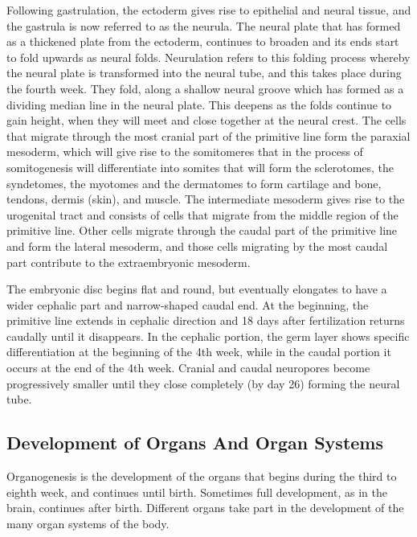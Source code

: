 Following gastrulation, the ectoderm gives rise to epithelial and neural tissue, and the gastrula is now referred to as the neurula. The neural plate that has formed as a thickened plate from the ectoderm, continues to broaden and its ends start to fold upwards as neural folds. Neurulation refers to this folding process whereby the neural plate is transformed into the neural tube, and this takes place during the fourth week. They fold, along a shallow neural groove which has formed as a dividing median line in the neural plate. This deepens as the folds continue to gain height, when they will meet and close together at the neural crest. The cells that migrate through the most cranial part of the primitive line form the paraxial mesoderm, which will give rise to the somitomeres that in the process of somitogenesis will differentiate into somites that will form the sclerotomes, the syndetomes, the myotomes and the dermatomes to form cartilage and bone, tendons, dermis (skin), and muscle. The intermediate mesoderm gives rise to the urogenital tract and consists of cells that migrate from the middle region of the primitive line. Other cells migrate through the caudal part of the primitive line and form the lateral mesoderm, and those cells migrating by the most caudal part contribute to the extraembryonic mesoderm.

The embryonic disc begins flat and round, but eventually elongates to have a wider cephalic part and narrow-shaped caudal end. At the beginning, the primitive line extends in cephalic direction and 18 days after fertilization returns caudally until it disappears. In the cephalic portion, the germ layer shows specific differentiation at the beginning of the 4th week, while in the caudal portion it occurs at the end of the 4th week. Cranial and caudal neuropores become progressively smaller until they close completely (by day 26) forming the neural tube.

\hypertarget{development-of-organs-and-organ-systems}{%
\subsection{Development of Organs And Organ Systems}\label{development-of-organs-and-organ-systems}}

Organogenesis is the development of the organs that begins during the third to eighth week, and continues until birth. Sometimes full development, as in the brain, continues after birth. Different organs take part in the development of the many organ systems of the body.

